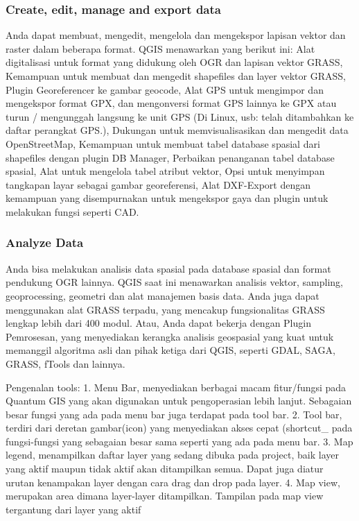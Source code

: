 	\subsubsection{Create, edit, manage and export data}
	Anda dapat membuat, mengedit, mengelola dan mengekspor lapisan vektor dan raster dalam beberapa format. QGIS menawarkan yang berikut ini: Alat digitalisasi untuk format yang didukung oleh OGR dan lapisan vektor GRASS, Kemampuan untuk membuat dan mengedit shapefiles dan layer vektor GRASS, Plugin Georeferencer ke gambar geocode, Alat GPS untuk mengimpor dan mengekspor format GPX, dan mengonversi format GPS lainnya ke GPX atau turun / mengunggah langsung ke unit GPS (Di Linux, usb: telah ditambahkan ke daftar perangkat GPS.), Dukungan untuk memvisualisasikan dan mengedit data OpenStreetMap, Kemampuan untuk membuat tabel database spasial dari shapefiles dengan plugin DB Manager, Perbaikan penanganan tabel database spasial, Alat untuk mengelola tabel atribut vektor, Opsi untuk menyimpan tangkapan layar sebagai gambar georeferensi, Alat DXF-Export dengan kemampuan yang disempurnakan untuk mengekspor gaya dan plugin untuk melakukan fungsi seperti CAD.
	\subsubsection{Analyze Data}
Anda bisa melakukan analisis data spasial pada database spasial dan format pendukung OGR lainnya. QGIS saat ini menawarkan analisis vektor, sampling, geoprocessing, geometri dan alat manajemen basis data. Anda juga dapat menggunakan alat GRASS terpadu, yang mencakup fungsionalitas GRASS lengkap lebih dari 400 modul. Atau, Anda dapat bekerja dengan Plugin Pemrosesan, yang menyediakan kerangka analisis geospasial yang kuat untuk memanggil algoritma asli dan pihak ketiga dari QGIS, seperti GDAL, SAGA, GRASS, fTools dan lainnya.

	Pengenalan tools:
	1.	Menu Bar, menyediakan berbagai macam fitur/fungsi pada Quantum GIS yang akan digunakan untuk pengoperasian lebih lanjut. Sebagaian besar fungsi yang ada pada menu bar juga terdapat pada tool bar.
	2.	Tool bar, terdiri dari deretan gambar(icon) yang menyediakan akses cepat (shortcut_ pada fungsi-fungsi yang sebagaian besar sama seperti yang ada pada menu bar.
	3. Map legend, menampilkan daftar layer yang sedang dibuka pada project, baik layer yang aktif maupun tidak aktif akan ditampilkan semua. Dapat juga diatur urutan kenampakan layer dengan cara drag dan drop pada layer.
	4. Map view, merupakan area dimana layer-layer ditampilkan. Tampilan pada map view tergantung dari layer yang aktif

